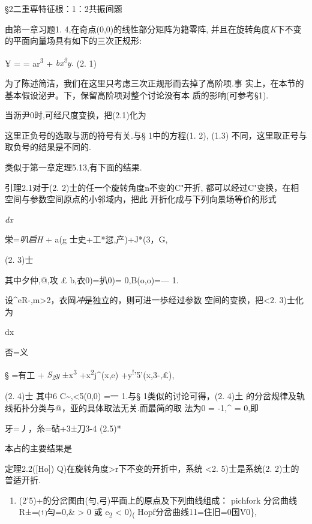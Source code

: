 \documentclass{article}
\begin{document}
\protect\hypertarget{bookmark146}{}{}§2二重専特征根：1：2共振间题

由第一章习题1. 4,在奇点(0,0)的线性部分矩阵为籍零阵,
并且在旋转角度\emph{K}下不变的平面向量场具有如下的三次正规形:

¥ = = ar\textsuperscript{3} + \emph{bx\textsuperscript{2}y.} (2. 1)

为了陈述简洁，我们在这里只考虑三次正规形而去掉了高阶项.事
实上，在本节的基本假设泌尹。下，保留高阶项对整个讨论没有本
质的影响(可参考§1).

当沥尹0时,可经尺度变换，把(2.1)化为

这里正负号的选取与沥的符号有关.与§ 1中的方程(1. 2), (1.3)
不同，这里取正号与取负号的结果是不同的.

类似于第一章定理5.13,有下面的结果.

引理2.1对于(2. 2)士的任一个旋转角度n不变的C"开折,
都可以经过C"变换，在相空间与参数空间原点的小邻域内，把此
开折化成与下列向景场等价的形式

\emph{dx}

栄=\emph{叭启H} + a(g 士史+工*愆,产)+J*(3，G,

(2. 3)士

其中夕仲,@,攻 £ b,衣0)=扒0)= 0,B(o,o)=--- 1. \textbar{}

设\^{}eR-,m\textgreater{}2，衣岡\emph{冲}是独立的，则可进一歩经过参数
空间的变换，把\textless{}2. 3)士化为

dx

否=义

§ =有工 + \emph{S\textsubscript{2}y} ±x\textsuperscript{3}
+x\textsuperscript{2}j\^{}(x,e) +y\textsuperscript{!}'5'(x,3-,£),

(2. 4)士 其中6 C\textasciitilde{},\textless{}5(0,0) =一 1.与§
1类似的讨论可得，(2. 4)土
的分岔规律及轨线拓扑分类与@，亚的具体取法无关.而最简的取 法为0 = -1,\^{}
= 0,即

牙=丿，糸=砧+3±刀3-4 (2.5)*

本占的主要结果是

定理2.2({[}Ho{]}) Q)在旋转角度\textgreater{}r下不变的开折中，系统
\textless{}2. 5)士是系统(2. 2)士的普适开折.

\begin{enumerate}
\def\labelenumi{(\arabic{enumi})}
\setcounter{enumi}{1}
\item
  (2'5)+的分岔图由(勻,弓)平面上的原点及下列曲线组成： pichfork 分岔曲线
  R±=⑴勻=0,\& \textgreater{} 0 或 e\textsubscript{2} \textless{}
  0)\textsubscript{(} Hopf分岔曲线11=住旧=0国V0\},
\end{enumerate}
\end{document}
